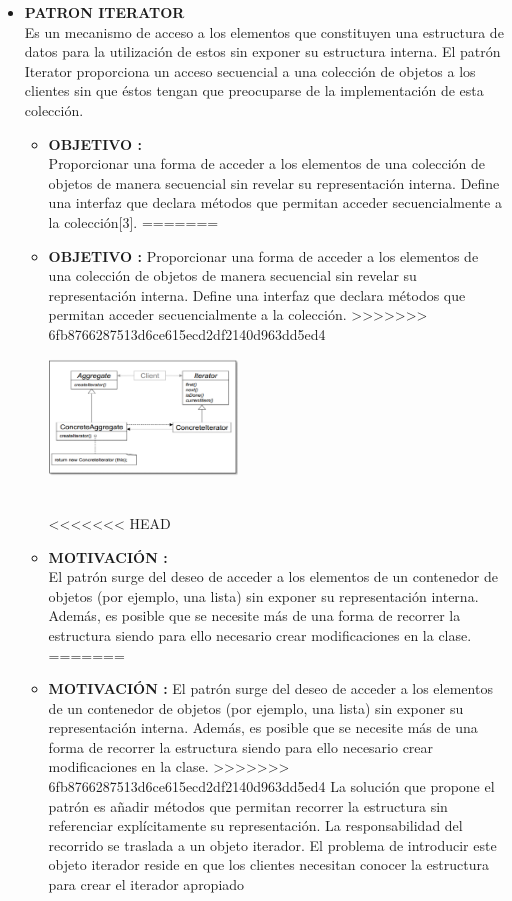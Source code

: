 \documentclass[twoside,twocolumn]{article}
\begin{document}
\begin{itemize}
\begin{itemize}
\begin{itemize}
    \item \textbf{PATRON ITERATOR} \\
    Es un mecanismo de acceso a los elementos que constituyen una estructura de datos para la utilización de estos sin exponer su estructura interna. 
    El patrón Iterator proporciona un acceso secuencial a una colección de objetos a los clientes sin que éstos tengan que preocuparse de la implementación de esta colección. 
    
	\begin{itemize}
<<<<<<< HEAD
		\item \textbf{OBJETIVO :}	\\Proporcionar una forma de acceder a los elementos de una colección de objetos de manera secuencial sin revelar su representación interna. 
        Define una interfaz que declara métodos que permitan acceder secuencialmente a la colección[3].
=======
		\item \textbf{OBJETIVO :}	Proporcionar una forma de acceder a los elementos de una colección de objetos de manera secuencial sin revelar su representación interna. 
        Define una interfaz que declara métodos que permitan acceder secuencialmente a la colección. 
>>>>>>> 6fb8766287513d6ce615ecd2df2140d963dd5ed4
         
        \begin{center}
            \includegraphics[width=5cm]{./img/Imagen9.png} 
        \end{center}
        \\
<<<<<<< HEAD
		\item \textbf{MOTIVACIÓN  :}\\ El patrón surge del deseo de acceder a los elementos de un contenedor de objetos (por ejemplo, una lista) sin exponer su representación interna. Además, es posible que se necesite más de una forma de recorrer la estructura siendo para ello necesario crear modificaciones en la clase. 
=======
		\item \textbf{MOTIVACIÓN  :} El patrón surge del deseo de acceder a los elementos de un contenedor de objetos (por ejemplo, una lista) sin exponer su representación interna. Además, es posible que se necesite más de una forma de recorrer la estructura siendo para ello necesario crear modificaciones en la clase. 
>>>>>>> 6fb8766287513d6ce615ecd2df2140d963dd5ed4
        La solución que propone el patrón es añadir métodos que permitan recorrer la estructura sin referenciar explícitamente su representación. La responsabilidad del recorrido se traslada a un objeto iterador.  
        El problema de introducir este objeto iterador reside en que los clientes necesitan conocer la estructura para crear el iterador apropiado
         


\end{itemize}
\end{itemize}
\end{itemize}
\end{itemize}
\end{document}
